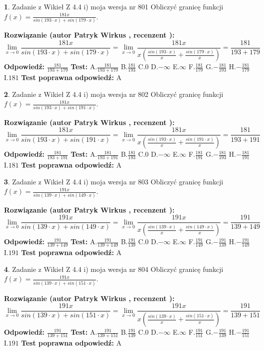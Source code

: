 \documentclass[12pt, a4paper]{article}
\theoremstyle{definition} %
\newtheorem{zad}{}
\newcommand{\zadStart}[1]{\begin{zad}#1\newline}
\newcommand{\zadStop}{\end{zad}}
\newcommand{\rozwStart}[2]{\noindent \textbf{Rozwiązanie (autor #1 , recenzent #2): }\newline}
\newcommand{\rozwStop}{\newline}
\newcommand{\odpStart}{\noindent \textbf{Odpowiedź:}\newline}
\newcommand{\odpStop}{\newline}
\newcommand{\testStart}{\noindent \textbf{Test:}\newline}
\newcommand{\testStop}{\newline}
\newcommand{\kluczStart}{\noindent \textbf{Test poprawna odpowiedź:}\newline}
\newcommand{\kluczStop}{\newline}
\begin{document}
\zadStart{Zadanie z Wikieł Z 4.4 i) moja wersja nr 801}
Obliczyć granicę funkcji $f(x)=\frac{181x}{sin(193\cdot x) +sin(179\cdot x)}$.
\zadStop
\rozwStart{Patryk Wirkus}{}
$$\lim\limits_{x\to 0}\frac{181x}{sin(193\cdot x) +sin(179\cdot x)}=\lim\limits_{x\to 0}\frac{181x}{x(\frac{sin(193\cdot x)}{x}+\frac{sin(179\cdot x)}{x})}=\frac{181}{193+179}$$
\rozwStop
\odpStart
$\frac{181}{193+179}$
\odpStop
\testStart
A.$\frac{181}{193+179}$
B.$\frac{181}{193}$
C.$0$
D.$-\infty$
E.$\infty$
F.$\frac{181}{179}$
G.$-\frac{181}{193}$
H.$-\frac{181}{179}$
I.$181$
\testStop
\kluczStart
A
\kluczStop



\zadStart{Zadanie z Wikieł Z 4.4 i) moja wersja nr 802}
Obliczyć granicę funkcji $f(x)=\frac{181x}{sin(193\cdot x) +sin(191\cdot x)}$.
\zadStop
\rozwStart{Patryk Wirkus}{}
$$\lim\limits_{x\to 0}\frac{181x}{sin(193\cdot x) +sin(191\cdot x)}=\lim\limits_{x\to 0}\frac{181x}{x(\frac{sin(193\cdot x)}{x}+\frac{sin(191\cdot x)}{x})}=\frac{181}{193+191}$$
\rozwStop
\odpStart
$\frac{181}{193+191}$
\odpStop
\testStart
A.$\frac{181}{193+191}$
B.$\frac{181}{193}$
C.$0$
D.$-\infty$
E.$\infty$
F.$\frac{181}{191}$
G.$-\frac{181}{193}$
H.$-\frac{181}{191}$
I.$181$
\testStop
\kluczStart
A
\kluczStop



\zadStart{Zadanie z Wikieł Z 4.4 i) moja wersja nr 803}
Obliczyć granicę funkcji $f(x)=\frac{191x}{sin(139\cdot x) +sin(149\cdot x)}$.
\zadStop
\rozwStart{Patryk Wirkus}{}
$$\lim\limits_{x\to 0}\frac{191x}{sin(139\cdot x) +sin(149\cdot x)}=\lim\limits_{x\to 0}\frac{191x}{x(\frac{sin(139\cdot x)}{x}+\frac{sin(149\cdot x)}{x})}=\frac{191}{139+149}$$
\rozwStop
\odpStart
$\frac{191}{139+149}$
\odpStop
\testStart
A.$\frac{191}{139+149}$
B.$\frac{191}{139}$
C.$0$
D.$-\infty$
E.$\infty$
F.$\frac{191}{149}$
G.$-\frac{191}{139}$
H.$-\frac{191}{149}$
I.$191$
\testStop
\kluczStart
A
\kluczStop



\zadStart{Zadanie z Wikieł Z 4.4 i) moja wersja nr 804}
Obliczyć granicę funkcji $f(x)=\frac{191x}{sin(139\cdot x) +sin(151\cdot x)}$.
\zadStop
\rozwStart{Patryk Wirkus}{}
$$\lim\limits_{x\to 0}\frac{191x}{sin(139\cdot x) +sin(151\cdot x)}=\lim\limits_{x\to 0}\frac{191x}{x(\frac{sin(139\cdot x)}{x}+\frac{sin(151\cdot x)}{x})}=\frac{191}{139+151}$$
\rozwStop
\odpStart
$\frac{191}{139+151}$
\odpStop
\testStart
A.$\frac{191}{139+151}$
B.$\frac{191}{139}$
C.$0$
D.$-\infty$
E.$\infty$
F.$\frac{191}{151}$
G.$-\frac{191}{139}$
H.$-\frac{191}{151}$
I.$191$
\testStop
\kluczStart
A
\kluczStop
\end{document}
